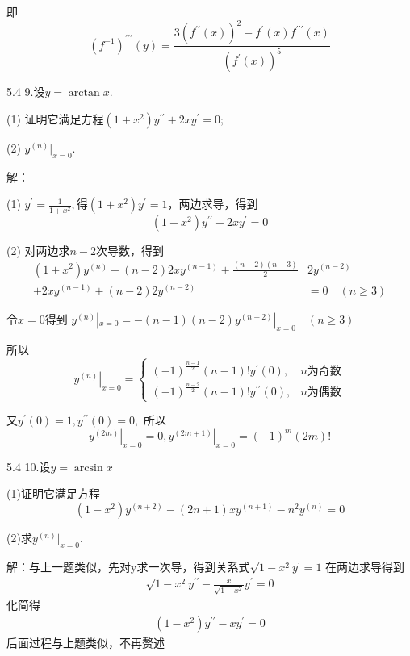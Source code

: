 \documentclass[12pt, a4paper]{ctexart}
\begin{document}
\begin{flushleft}
    即 
    $$
    (f^{-1})^{\prime \prime \prime}(y)=\frac{3\left(f^{\prime \prime}(x)\right)^{2}-f^{\prime}(x) f^{\prime \prime \prime}(x)}{\left(f^{\prime}(x)\right)^{5}}
    $$

    \bigskip

    
    5.4 9.设$y = \arctan x.$

    (1) 证明它满足方程$(1+x^2)y^{\prime \prime} + 2xy^{\prime} = 0;$

    (2) $y^{(n)} | _ {x = 0}.$
    
    解：

    (1) $y ^ {\prime} = \frac{ 1 }{ 1 + x ^2 },$得$(1 + x^2) y ^ {\prime} = 1$，两边求导，得到
    \[
\left(1+x^{2}\right) y^{\prime \prime}+2 x y^{\prime}=0
\]


    (2) 对两边求$n - 2$次导数，得到
    \[
\begin{aligned}\left(1+x^{2}\right) y^{(n)}+(n-2) 2 x y^{(n-1)}+\frac{(n-2)(n-3)}{2} & 2 y^{(n-2)} \\+2 x y^{(n-1)}+(n-2) 2 y^{(n-2)} &=0 \quad(n \geqslant 3) \end{aligned}
\]

    令$x = 0$得到
    $y^{(n)} | _{x= 0} = -(n - 1)(n - 2)y^{(n - 2)} | _ {x= 0} \quad (n \geqslant 3)$

    所以
    \[
\left.y^{(n)}\right|_{x=0}=\left\{\begin{array}{ll}{(-1)^{\frac{n-1}{2}}(n-1) !y^{\prime}(0),} & {n \text{为奇数}} \\ {(-1)^{\frac{n-2}{2}}(n-1) ! y^{\prime \prime}(0),} & {n \text{为偶数}}\end{array}\right.
\]

    又$y^{\prime}(0) = 1, y^{\prime \prime}(0) = 0,$ 所以
    \[
\left.y^{(2 m)}\right|_{x=0}=0,\left.y^{(2 m+1)}\right|_{x=0}=(-1)^{m}(2 m) !
\]

    5.4 10.设$y = \arcsin x$

    (1)证明它满足方程
    \[
\left(1-x^{2}\right) y^{(n+2)}-(2 n+1) x y^{(n+1)}-n^{2} y^{(n)}=0
\]

    (2)求$y^{(n)} | _ {x = 0}.$

    解：与上一题类似，先对y求一次导，得到关系式$\sqrt{1 - x ^ 2} y ^ {\prime} = 1 $
    在两边求导得到    
    \[
\begin{array}{c}{\sqrt{1-x^{2}} y^{\prime \prime}-\frac{x}{\sqrt{1-x^{2}}} y^{\prime}=0} \end{array}
\]
化简得
\[
\begin{aligned}  
    {\left(1-x^{2}\right) y^{\prime \prime}-x y^{\prime}=0} 
\end{aligned}
\]
后面过程与上题类似，不再赘述


\end{flushleft}
\end{document}
